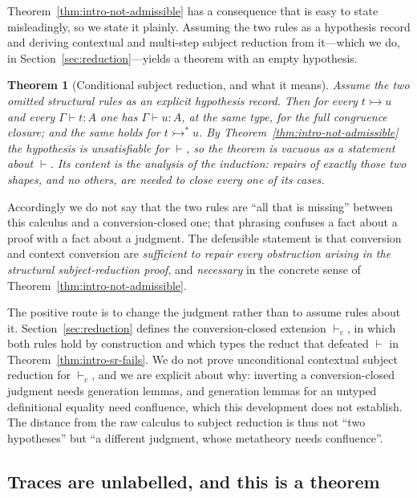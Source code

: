 \documentclass[10pt,reqno]{amsart}
\newtheorem{theorem}{Theorem}[section]
\newcommand{\ctxred}{\mathrel{\rightarrowtail}}
\newcommand{\vdashC}{\vdash_{\mathrm{c}}}
\newcommand{\ctxredstar}{\mathrel{\rightarrowtail^{*}}}
\begin{document}
Theorem~\ref{thm:intro-not-admissible} has a consequence that is easy to state
misleadingly, so we state it plainly.  Assuming the two rules as a hypothesis
record and deriving contextual and multi-step subject reduction from it---which
we do, in Section~\ref{sec:reduction}---yields a theorem with an empty
hypothesis.

\begin{theorem}[Conditional subject reduction, and what it means]
\label{thm:intro-subject-reduction}
Assume the two omitted structural rules as an explicit hypothesis record.  Then
for every \(t\ctxred u\) and every \(\Gamma\vdash t:A\) one has
\(\Gamma\vdash u:A\), at the same type, for the full congruence closure; and the
same holds for \(t\ctxredstar u\).  By
Theorem~\ref{thm:intro-not-admissible} the hypothesis is unsatisfiable for
\(\vdash\), so the theorem is vacuous as a statement \emph{about} \(\vdash\).
Its content is the analysis of the induction: repairs of exactly those two
shapes, and no others, are needed to close every one of its cases.
\end{theorem}

Accordingly we do not say that the two rules are ``all that is missing''
between this calculus and a conversion-closed one; that phrasing confuses a fact
about a proof with a fact about a judgment.  The defensible statement is that
conversion and context conversion are \emph{sufficient to repair every
obstruction arising in the structural subject-reduction proof}, and
\emph{necessary} in the concrete sense of
Theorem~\ref{thm:intro-not-admissible}.

The positive route is to change the judgment rather than to assume rules about
it.  Section~\ref{sec:reduction} defines the conversion-closed extension
\(\vdashC\), in which both rules hold by construction and which types the reduct
that defeated \(\vdash\) in Theorem~\ref{thm:intro-sr-fails}.  We do not prove
unconditional contextual subject reduction for \(\vdashC\), and we are explicit
about why: inverting a conversion-closed judgment needs generation lemmas, and
generation lemmas for an untyped definitional equality need confluence, which
this development does not establish.  The distance from the raw calculus to
subject reduction is thus not ``two hypotheses'' but ``a different judgment,
whose metatheory needs confluence''.

\subsection*{Traces are unlabelled, and this is a theorem}
\end{document}
